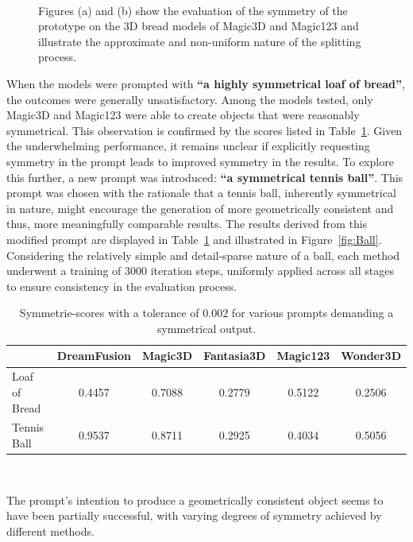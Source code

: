 \begin{figure}[ht]
\begin{subfigure}[b]{0.248\textwidth}
        \caption{}
    \end{subfigure}
    \caption{Figures (a) and (b) show the evaluation of the symmetry of the prototype on the 3D bread models of Magic3D and Magic123 and illustrate the approximate and non-uniform nature of the splitting process.}~\label{fig:split}
\end{figure}

When the models were prompted with \textbf{``a highly symmetrical loaf of bread''}, the outcomes were generally unsatisfactory. Among the models tested, only Magic3D and Magic123 were able to create objects that were reasonably symmetrical. This observation is confirmed by the scores listed in Table~\ref{table:symmetryScores}. Given the underwhelming performance, it remains unclear if explicitly requesting symmetry in the prompt leads to improved symmetry in the results. To explore this further, a new prompt was introduced: \textbf{``a symmetrical tennis ball''}. This prompt was chosen with the rationale that a tennis ball, inherently symmetrical in nature, might encourage the generation of more geometrically consistent and thus, more meaningfully comparable results. The results derived from this modified prompt are displayed in Table~\ref{table:symmetryScores} and illustrated in Figure~\ref{fig:Ball}. Considering the relatively simple and detail-sparse nature of a ball, each method underwent a training of 3000 iteration steps, uniformly applied across all stages to ensure consistency in the evaluation process.

\begin{table}[ht]
    \centering
    \small
    \begin{tabular}{lccccc}
    \toprule
    {} & DreamFusion & Magic3D & Fantasia3D & Magic123 & Wonder3D \\
    \midrule
    Loaf of Bread & 0.4457 & 0.7088 & 0.2779 & 0.5122 & 0.2506 \\
    Tennis Ball & 0.9537 & 0.8711 & 0.2925 & 0.4034 & 0.5056 \\
    \bottomrule
    \end{tabular}
    \caption{Symmetrie-scores with a tolerance of 0.002 for various prompts demanding a symmetrical output.}~\label{table:symmetryScores}
\end{table}

The prompt's intention to produce a geometrically consistent object seems to have been partially successful, with varying degrees of symmetry achieved by different methods.

